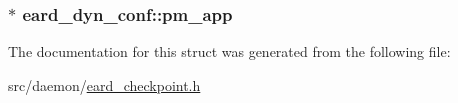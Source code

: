\subsubsection[{\texorpdfstring{pm\+\_\+app}{pm_app}}]{$\ast$ eard\+\_\+dyn\+\_\+conf\+::pm\+\_\+app}\hypertarget{structeard__dyn__conf_acd3d063b6232ac49e17b6627851f9c5a}{}\label{structeard__dyn__conf_acd3d063b6232ac49e17b6627851f9c5a}


The documentation for this struct was generated from the following file\+:\begin{DoxyCompactItemize}
\item 
src/daemon/\hyperlink{eard__checkpoint_8h}{eard\+\_\+checkpoint.\+h}\end{DoxyCompactItemize}
